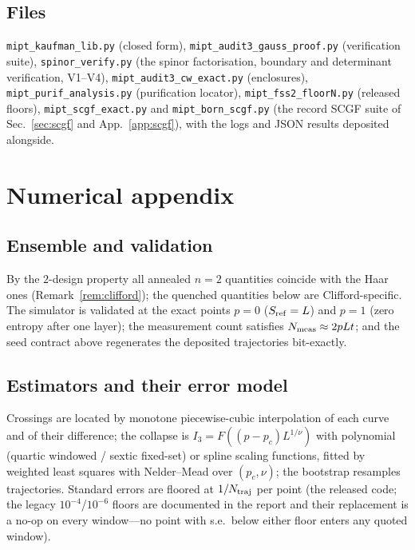 \documentclass[11pt]{article}
\begin{document}
\subsection{Files}\label{app:files}
\texttt{mipt\_kaufman\_lib.py} (closed form),
\texttt{mipt\_audit3\_gauss\_proof.py} (verification suite),
\texttt{spinor\_verify.py} (the spinor factorisation, boundary and
determinant verification, V1--V4),
\texttt{mipt\_audit3\_cw\_exact.py} (enclosures),
\texttt{mipt\_purif\_analysis.py} (purification locator),
\texttt{mipt\_fss2\_floorN.py} (released floors),
\texttt{mipt\_scgf\_exact.py} and \texttt{mipt\_born\_scgf.py} (the record
SCGF suite of Sec.~\ref{sec:scgf} and App.~\ref{app:scgf}), with the logs
and JSON results deposited alongside.

\section{Numerical appendix}\label{app:numerics}

\subsection{Ensemble and validation}
By the $2$-design property all annealed $n=2$ quantities coincide with the
Haar ones (Remark~\ref{rem:clifford}); the quenched quantities below are
Clifford-specific.  The simulator is validated at the exact points $p=0$
($S_{\rm ref}=L$) and $p=1$ (zero entropy after one layer); the measurement
count satisfies $N_{\rm meas}\approx2pLt$; and the seed contract above
regenerates the deposited trajectories bit-exactly.

\subsection{Estimators and their error model}
Crossings are located by monotone piecewise-cubic interpolation of each
curve and of their difference; the collapse is
$I_3=F((p-p_c)L^{1/\nu})$ with polynomial (quartic windowed / sextic
fixed-set) or spline scaling functions, fitted by weighted least squares
with Nelder--Mead over $(p_c,\nu)$; the bootstrap resamples trajectories.
Standard errors are floored at $1/N_{\rm traj}$ per point (the released
code; the legacy $10^{-4}$/$10^{-6}$ floors are documented in the report and
their replacement is a no-op on every window---no point with s.e.\ below
either floor enters any quoted window).
\end{document}
